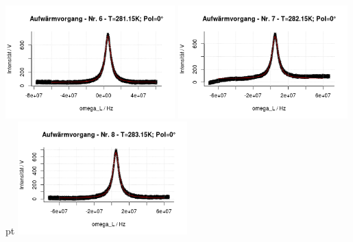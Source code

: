 \documentclass[12pt]{article}
\begin{document}
\begin{minipage}[h!]{\textwidth}
	\includegraphics[width=0.49\textwidth]{figures/warm0-6.png}\vskip -10pt
	\includegraphics[width=0.49\textwidth]{figures/warm0-7.png} pt
	\includegraphics[width=0.49\textwidth]{figures/warm0-8.png}\vskip -10pt
\end{minipage}
\end{document}
